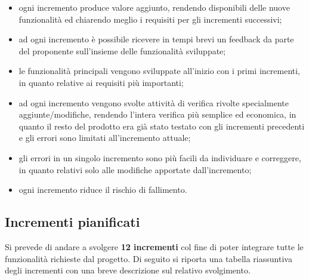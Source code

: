	\begin{itemize}
		\item ogni incremento produce valore aggiunto, rendendo disponibili delle nuove funzionalità ed chiarendo meglio i requisiti per gli incrementi successivi;
		\item ad ogni incremento è possibile ricevere in tempi brevi un feedback da parte del proponente sull'insieme delle funzionalità sviluppate;
		\item le funzionalità principali vengono sviluppate all'inizio con i primi incrementi, in quanto relative ai requisiti più importanti;
		\item ad ogni incremento vengono svolte attività di verifica rivolte specialmente aggiunte/modifiche, rendendo l'intera verifica più semplice ed economica, in quanto il resto del prodotto era già stato testato con gli incrementi precedenti e gli errori sono limitati all'incremento attuale;
		\item gli errori in un singolo incremento sono più facili da individuare e correggere, in quanto relativi solo alle modifiche apportate dall'incremento;
		\item ogni incremento riduce il rischio di fallimento.
	\end{itemize}

\subsection{Incrementi pianificati}

Si prevede di andare a svolgere \textbf{12 incrementi} col fine di poter integrare tutte le funzionalità richieste dal progetto. Di seguito si riporta una tabella riassuntiva degli incrementi con una breve descrizione sul relativo svolgimento.

